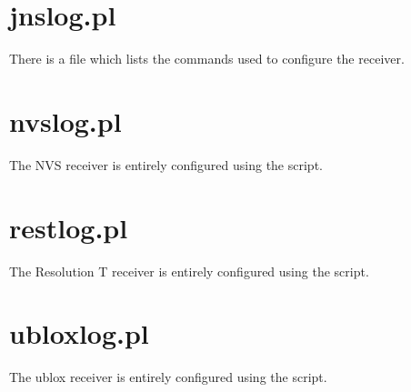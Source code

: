 \section{jnslog.pl}
\hypertarget{h:jnslog}{}
There is a file  which lists the commands used to configure the receiver.

\section{nvslog.pl}
\hypertarget{h:nvslog}{}

The NVS receiver is entirely configured using the script.

\section{restlog.pl}
\hypertarget{h:restlog}{}

The Resolution T receiver is entirely configured using the script.

\section{ubloxlog.pl}
\hypertarget{h:ubloxlog}{}

The ublox receiver is entirely configured using the script.


